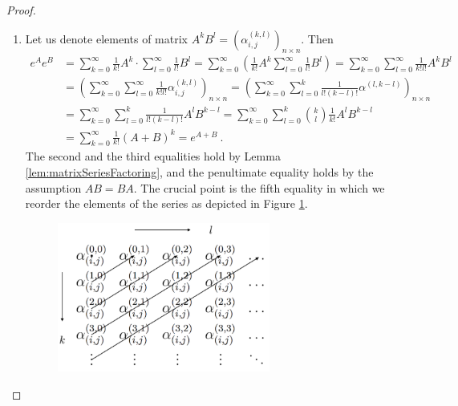 \begin{proof}
\begin{enumerate}
		\item Let us denote elements of matrix $A^kB^l=(\alpha^{(k,l)}_{i,j})_{n\times n}$. Then
		\begin{align*}
			e^{A}e^{B}
			&=\sum^\infty_{k=0}\frac{1}{k!}A^{k}\cdot\sum^\infty_{l=0}\frac{1}{l!}B^{l}
			=\sum^\infty_{k=0}\left(\frac{1}{k!}A^{k}\sum^\infty_{l=0}\frac{1}{l!}B^{l}\right)
			=\sum^\infty_{k=0}\sum^\infty_{l=0}\frac{1}{k!l!}A^kB^l
			\\
			&=\left(\sum^\infty_{k=0}\sum^\infty_{l=0}\frac{1}{k!l!}\alpha^{(k,l)}_{i,j}\right)_{n\times n}
			=\left(\sum^\infty_{k=0}\sum^k_{l=0}\frac{1}{l!(k-l)!}\alpha^{(l,k-l)}\right)_{n\times n}
			\\
			&=\sum^\infty_{k=0}\sum^k_{l=0}\frac{1}{l!(k-l)!}A^{l}B^{k-l}
			=\sum^\infty_{k=0}\sum^k_{l=0}\binom{k}{l}\frac{1}{k!}A^{l}B^{k-l}
			\\
			&=\sum^\infty_{k=0}\frac{1}{k!}(A+B)^{k}
			=e^{A+B}\ .
		\end{align*}
		The second and the third equalities hold by Lemma \ref{lem:matrixSeriesFactoring}, and the penultimate equality holds by the assumption $AB=BA$. The crucial point is the fifth equality in which we reorder the elements of the series as depicted in Figure \ref{fig:reordering}. 
		\begin{figure}[hp]
			\centering
			\includegraphics[width=70mm]{reordering_cropped.pdf}
			\captionsetup{justification=centering,margin=2cm}
			\label{fig:reordering}
		\end{figure}

\end{enumerate}
\end{proof}
